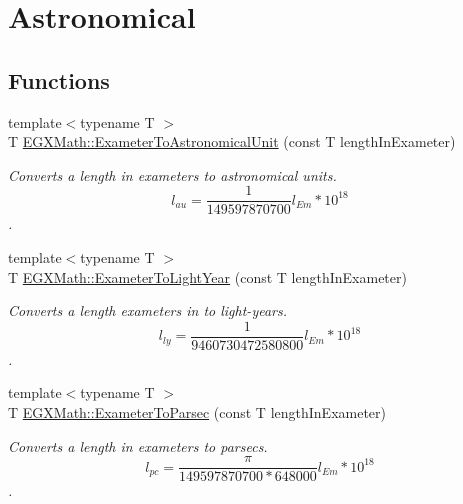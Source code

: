 \hypertarget{group___e_g_x_math-_conversions-_length_conversions-_s_i-_exameter-_astronomical}{}\section{Astronomical}
\label{group___e_g_x_math-_conversions-_length_conversions-_s_i-_exameter-_astronomical}
\subsection*{Functions}
\begin{DoxyCompactItemize}
\item 
{\footnotesize template$<$typename T $>$ }\\T \mbox{\hyperlink{group___e_g_x_math-_conversions-_length_conversions-_s_i-_exameter-_astronomical_gafe75957564bfe2508c37089fece97c41}{E\+G\+X\+Math\+::\+Exameter\+To\+Astronomical\+Unit}} (const T length\+In\+Exameter)
\begin{DoxyCompactList}\small\item\em Converts a length in exameters to astronomical units. \[ l_{au}= \frac{1}{149597870700} l_{Em} * 10^{18} \]. \end{DoxyCompactList}\item 
{\footnotesize template$<$typename T $>$ }\\T \mbox{\hyperlink{group___e_g_x_math-_conversions-_length_conversions-_s_i-_exameter-_astronomical_ga3867a3c149542e86e92d12147fd6d34e}{E\+G\+X\+Math\+::\+Exameter\+To\+Light\+Year}} (const T length\+In\+Exameter)
\begin{DoxyCompactList}\small\item\em Converts a length exameters in to light-\/years. \[ l_{ly}= \frac{1}{9460730472580800} l_{Em} * 10^{18} \]. \end{DoxyCompactList}\item 
{\footnotesize template$<$typename T $>$ }\\T \mbox{\hyperlink{group___e_g_x_math-_conversions-_length_conversions-_s_i-_exameter-_astronomical_ga807fef0b23d3c3c9b4a11c26bcd36b6e}{E\+G\+X\+Math\+::\+Exameter\+To\+Parsec}} (const T length\+In\+Exameter)
\begin{DoxyCompactList}\small\item\em Converts a length in exameters to parsecs. \[ l_{pc}=\frac{\pi}{149597870700 * 648000} l_{Em} * 10^{18} \]. \end{DoxyCompactList}\end{DoxyCompactItemize}


